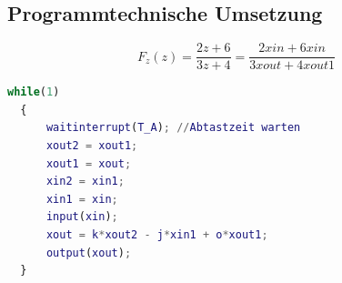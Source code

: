 
\subsection{Programmtechnische Umsetzung}
\[F_z(z) = \frac{2z+6}{3z+4} = \frac{2xin+6xin}{3xout+4xout1}\]

\begin{lstlisting}[language=Matlab]
  while(1)
  {
      waitinterrupt(T_A); //Abtastzeit warten
      xout2 = xout1;
      xout1 = xout;
      xin2 = xin1;
      xin1 = xin;
      input(xin);
      xout = k*xout2 - j*xin1 + o*xout1;
      output(xout);
  }
\end{lstlisting}